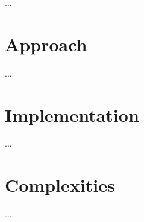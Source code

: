 

  ...
  
  \section{Approach}
    ...
  \section{Implementation}
    ...
  \section{Complexities}
    ...
